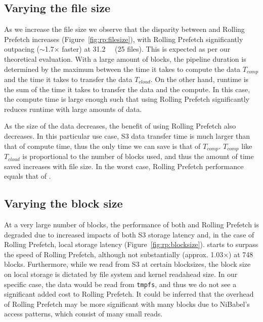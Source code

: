 \subsection{Varying the file size}
As we increase the file size we observe that the disparity between \sfs and
Rolling Prefetch increases (Figure~\ref{fig:rp:filesize}), with Rolling Prefetch
significantly outpacing ($\sim$1.7$\times$ faster) \sfs at \SI{31.2}{\gibi\byte} (25
files). This is expected as per our theoretical evaluation. With a large amount
of blocks, the pipeline duration is determined by the maximum between the time
it takes to compute the data $T_{comp}$ and the time it takes to transfer the
data $T_{cloud}$. On the other hand, \sfs runtime is the sum of the time it
takes to transfer the data and the compute. In this case, the compute time is
large enough such that using Rolling Prefetch significantly reduces runtime with
large amounts of data.

As the size of the data decreases, the benefit of using Rolling Prefetch also
decreases. 
In this particular use case, S3 data transfer time is much larger than that of
compute time, thus the only time we can save is that of $T_{comp}$. $T_{comp}$
like ${T_{cloud}}$ is proportional to the number of blocks used, and thus the
amount of time saved increases with file size. In the worst case, Rolling
Prefetch performance equals that of \sfs.

\subsection{Varying the block size}%

At a very large number of blocks, the performance of both \sfs and Rolling
Prefetch is degraded due to increased impacts of both S3 storage latency and, in
the case of Rolling Prefetch, local storage latency
(Figure~\ref{fig:rp:blocksize}).  \sfs starts to surpass the speed of Rolling
Prefetch, although not substantially (approx. 1.03$\times$) at 748 blocks.
Furthermore, while we read from S3 at certain blocksizes, the block size on
local storage is dictated by file system and kernel readahead size. In our
specific case, the data would be read from \texttt{tmpfs}, and thus we do not
see a significant added cost to Rolling Prefetch. It could be inferred that the
overhead of Rolling Prefetch may be more significant with many
blocks due to NiBabel's access patterns, which consist of many small reads.

